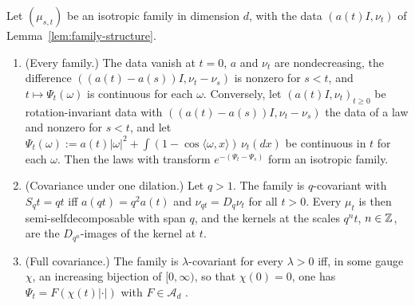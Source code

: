 \begin{theorem}
\label{thm:lattice-strata}
\leanok
{}
Let $(\mu_{s,t})$ be an isotropic family in dimension $d$, with the data $(a(t)I, \nu_t)$ of
Lemma~\ref{lem:family-structure}.
\begin{enumerate}
\item (Every family.) The data vanish at $t = 0$, $a$ and $\nu_t$ are nondecreasing, the difference
$((a(t) - a(s))I, \nu_t - \nu_s)$ is nonzero for $s < t$, and $t \mapsto \Psi_t(\omega)$ is
continuous for each $\omega$. Conversely, let $(a(t)I, \nu_t)_{t \ge 0}$ be rotation-invariant
\Levy{} data
with $((a(t) - a(s))I, \nu_t - \nu_s)$ the data of a law and nonzero
for $s < t$, and let $\Psi_t(\omega) := a(t)|\omega|^2 + \int(1 - \cos\langle\omega, x\rangle)\,\nu_t(dx)$
be continuous in $t$ for each $\omega$. Then the laws with transform $e^{-(\Psi_t - \Psi_s)}$ form an
isotropic family.
\item (Covariance under one dilation.) Let $q > 1$. The family is $q$-covariant with $S_qt = qt$ iff
$a(qt) = q^2a(t)$ and $\nu_{qt} = D_q\nu_t$ for all $t > 0$. Every $\mu_t$ is then
semi-selfdecomposable with span $q$, and the kernels at the scales $q^nt$, $n \in \mathbb{Z}$, are the
$D_{q^n}$-images of the kernel at $t$.
\item (Full covariance.) The family is $\lambda$-covariant for every $\lambda > 0$ iff, in some gauge
$\chi$, an increasing bijection of $[0,\infty)$, so that $\chi(0) = 0$, one has
$\Psi_t = F(\chi(t)|\cdot|)$ with $F \in \mathcal{A}_d$ .
\end{enumerate}

\end{theorem}
